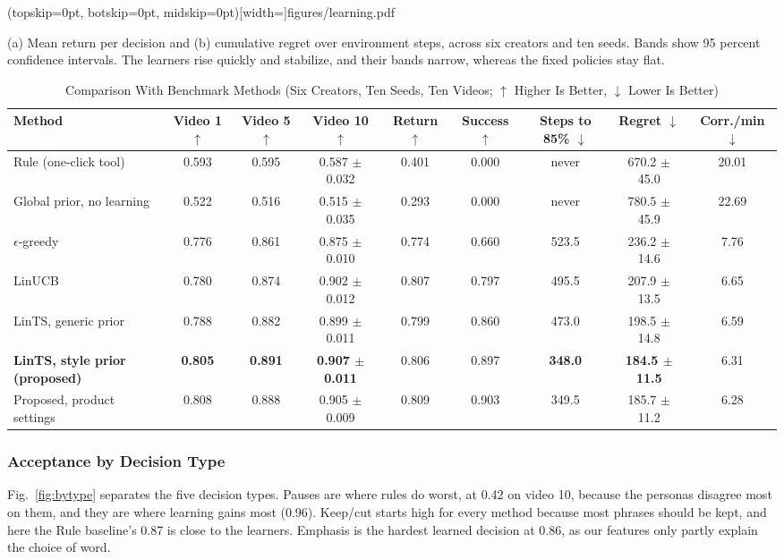 \documentclass{ieeeaccess}
\begin{document}
\Figure[t!](topskip=0pt, botskip=0pt, midskip=0pt)[width=\textwidth]{figures/learning.pdf}
{\parbox[t]{0.91\textwidth}{\raggedright (a) Mean return per decision and (b) cumulative regret over environment steps, across six creators and ten seeds. Bands show 95 percent confidence intervals. The learners rise quickly and stabilize, and their bands narrow, whereas the fixed policies stay flat.}\label{fig:learning}}

\begin{table}[t]
\caption{Comparison With Benchmark Methods (Six Creators, Ten Seeds, Ten Videos; $\uparrow$ Higher Is Better, $\downarrow$ Lower Is Better)}
\label{tab:compare}
\setlength{\tabcolsep}{3.5pt}
\centering
\begin{tabular}{|l|c|c|c|c|c|c|c|c|}
\hline
Method & Video 1 $\uparrow$ & Video 5 $\uparrow$ & Video 10 $\uparrow$ & Return $\uparrow$ & Success $\uparrow$ & Steps to 85\% $\downarrow$ & Regret $\downarrow$ & Corr./min $\downarrow$ \\
\hline
Rule (one-click tool) & 0.593 & 0.595 & 0.587 $\pm$ 0.032 & 0.401 & 0.000 & never & 670.2 $\pm$ 45.0 & 20.01 \\
Global prior, no learning & 0.522 & 0.516 & 0.515 $\pm$ 0.035 & 0.293 & 0.000 & never & 780.5 $\pm$ 45.9 & 22.69 \\
$\epsilon$-greedy & 0.776 & 0.861 & 0.875 $\pm$ 0.010 & 0.774 & 0.660 & 523.5 & 236.2 $\pm$ 14.6 & 7.76 \\
LinUCB & 0.780 & 0.874 & 0.902 $\pm$ 0.012 & 0.807 & 0.797 & 495.5 & 207.9 $\pm$ 13.5 & 6.65 \\
LinTS, generic prior & 0.788 & 0.882 & 0.899 $\pm$ 0.011 & 0.799 & 0.860 & 473.0 & 198.5 $\pm$ 14.8 & 6.59 \\
\textbf{LinTS, style prior (proposed)} & \textbf{0.805} & \textbf{0.891} & \textbf{0.907 $\pm$ 0.011} & 0.806 & 0.897 & \textbf{348.0} & \textbf{184.5 $\pm$ 11.5} & 6.31 \\
Proposed, product settings & 0.808 & 0.888 & 0.905 $\pm$ 0.009 & 0.809 & 0.903 & 349.5 & 185.7 $\pm$ 11.2 & 6.28 \\
\hline
\end{tabular}
\end{table}

\subsubsection{Acceptance by Decision Type}
Fig.~\ref{fig:bytype} separates the five decision types. Pauses are where rules do worst, at 0.42 on video 10, because the personas disagree most on them, and they are where learning gains most (0.96). Keep/cut starts high for every method because most phrases should be kept, and here the Rule baseline's 0.87 is close to the learners. Emphasis is the hardest learned decision at 0.86, as our features only partly explain the choice of word.
\end{document}
